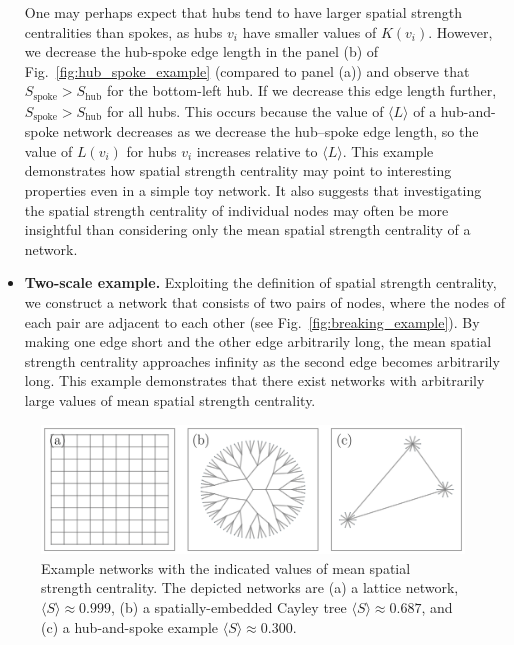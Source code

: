 \documentclass[%
 reprint,
 amsmath,amssymb,
 aps,
]{revtex4-1}
\begin{document}
\begin{itemize}
{{\color{red}One may perhaps expect that hubs tend to have larger spatial strength centralities than spokes, as hubs $v_i$ have smaller values of $K(v_i)$. However, we decrease the hub-spoke edge length in the panel (b) of Fig.~\ref{fig:hub_spoke_example} (compared to panel (a)) and observe that $S_{\text{spoke}} > S_{\text{hub}}$ for the bottom-left hub. If we decrease this edge length further, $S_{\text{spoke}} > S_{\text{hub}}$ for all hubs.}
  This occurs because the value of $\langle L \rangle$ of a hub-and-spoke network decreases as we decrease the hub--spoke edge length, so the value of $L(v_i) $ for hubs $v_i$ increases relative to $\langle L \rangle$. 
  This example demonstrates how spatial strength centrality may point to interesting properties even in a 
  simple toy network. It also suggests that investigating the spatial strength centrality of individual nodes may often be more insightful than considering only the mean spatial strength centrality of a network.
  }
\item{\textbf{Two-scale example.} Exploiting the definition of spatial strength centrality, we construct a network that consists of two pairs of nodes, where the nodes of each pair are adjacent to each other (see Fig.~\ref{fig:breaking_example}). By making one edge short and the other edge arbitrarily long, the mean spatial strength centrality approaches infinity as the second edge becomes arbitrarily long. This example demonstrates that there exist networks with arbitrarily large values of mean spatial strength centrality. 
}
\end{itemize}



\begin{figure}
    \centering
    \includegraphics[width=1.0\linewidth]{toy_network_examples.pdf}
    \caption{Example networks with the indicated values of mean spatial strength centrality. The depicted networks are (a) a lattice network, $\langle S \rangle \approx 0.999$, (b) a spatially-embedded Cayley tree $\langle S \rangle \approx 0.687$, and (c) a hub-and-spoke example $\langle S \rangle \approx 0.300$.
    }
    \label{fig:toy_network_examples}
\end{figure}
\end{document}

